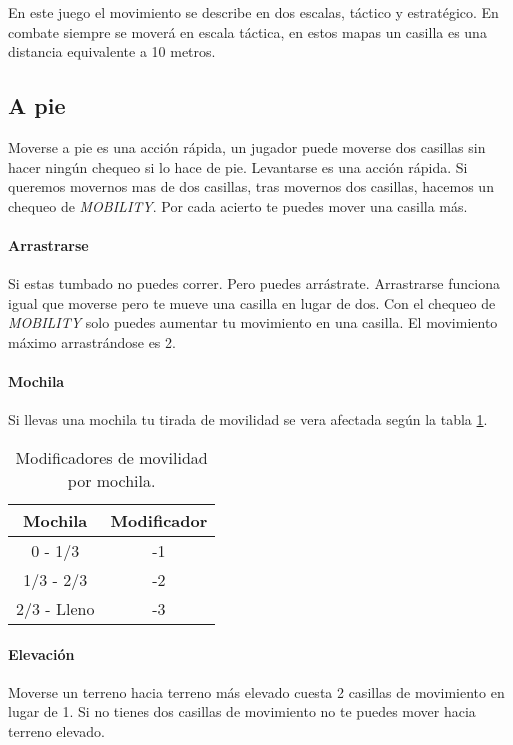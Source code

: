 En este juego el movimiento se describe en dos escalas, táctico y estratégico. En combate siempre se moverá en escala táctica, en estos mapas un casilla es una distancia equivalente a 10 metros.

    \subsection{A pie}
        Moverse a pie es una acción rápida, un jugador puede moverse dos casillas sin hacer ningún chequeo si lo hace de pie.
        Levantarse es una acción rápida. Si queremos movernos mas de dos casillas, tras movernos dos casillas, hacemos un chequeo de \emph{MOBILITY}.
        Por cada acierto te puedes mover una casilla más.

        \paragraph{Arrastrarse}
        Si estas tumbado no puedes correr. Pero puedes arrástrate. Arrastrarse funciona igual que moverse pero te mueve una casilla en lugar de dos.
        Con el chequeo de \emph{MOBILITY} solo puedes aumentar tu movimiento en una casilla. El movimiento máximo arrastrándose es 2.

        \paragraph{Mochila}
        Si llevas una mochila tu tirada de movilidad se vera afectada según la tabla \ref{table:1}.

        \begin{table}
            \centering
            \begin{tabular}{ c c }
                \hline
                Mochila & Modificador \\
                \hline
                0 - 1/3 & -1 \\
                1/3 - 2/3 & -2 \\
                2/3 - Lleno & -3 \\
                \hline
            \end{tabular}
            \caption{Modificadores de movilidad por mochila.}
            \label{table:1}
        \end{table}

        \paragraph{Elevación}
        Moverse un terreno hacia terreno más elevado cuesta 2 casillas de movimiento en lugar de 1. Si no tienes dos casillas de movimiento no te puedes mover hacia terreno elevado.


